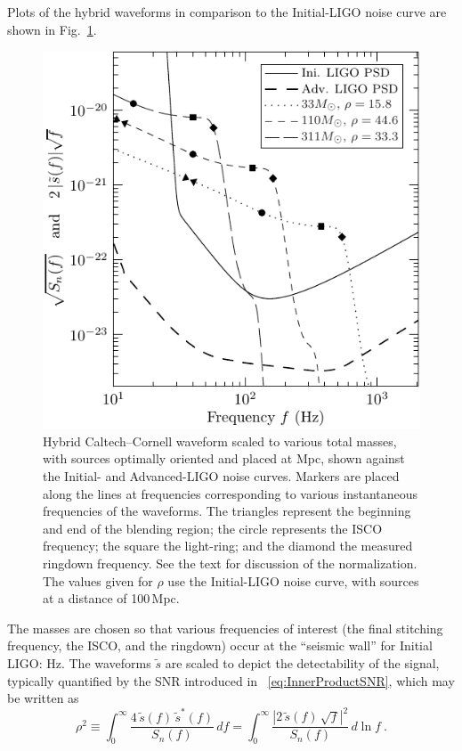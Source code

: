 Plots of the hybrid waveforms in comparison to the Initial-LIGO noise
curve are shown in Fig.~\ref{fig:StildesAndInitialPSD}.
\begin{figure}
  \begin{center}
    \includegraphics[width=0.55\linewidth]{figures/comparison/StildesAndInitialPSD}
  \end{center}
  \caption[Hybrid Caltech--Cornell waveform scaled to various total masses]{
  \label{fig:StildesAndInitialPSD}
    Hybrid Caltech--Cornell waveform scaled to various total
    masses, with sources optimally oriented and placed at
    \unit[100]{Mpc}, shown against the Initial- and Advanced-LIGO
    noise curves.  Markers are placed along the lines at frequencies
    corresponding to various instantaneous frequencies of the
    waveforms.  The triangles represent the beginning and end of the
    blending region; the circle represents the ISCO frequency; the
    square the light-ring; and the diamond the measured ringdown
    frequency.  See the text for discussion of the normalization.  The
    values given for $\rho$ use the Initial-LIGO noise curve, with
    sources at a distance of 100\,Mpc.}
\end{figure}%
The masses are chosen so that various frequencies of interest (the
final stitching frequency, the ISCO, and the ringdown) occur at the
``seismic wall'' for Initial LIGO: \unit[40]{Hz}.  The waveforms
$\tilde{s}$ are scaled to depict the detectability of the signal,
typically quantified by the SNR introduced in
~\eqref{eq:InnerProductSNR}, which may be written as
\begin{equation}
  \label{eq:SNR}
  \rho^{2} \equiv \int_0^\infty \frac{4\, \tilde{s}(f)\,
    \tilde{s}^\ast(f)} {S_n(f)}\, d f = \int_0^\infty
  \frac{\left\lvert 2\, \tilde{s}(f)\, \sqrt{f} \right\rvert^{2}}
  {S_n(f)}\, d\ln{f}\ .
\end{equation}
